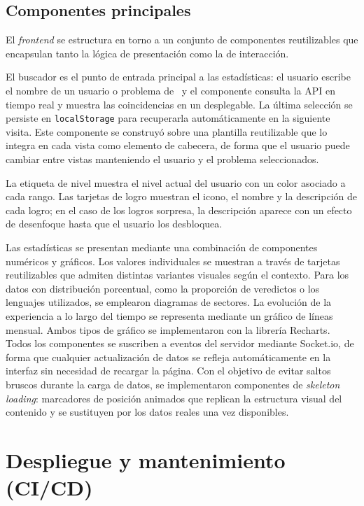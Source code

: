 \subsection{Componentes principales}

El \textit{frontend} se estructura en torno a un conjunto de componentes reutilizables que encapsulan tanto la lógica de presentación como la de interacción.

El buscador es el punto de entrada principal a las estadísticas: el usuario escribe el nombre de un usuario o problema de \aer\ y el componente consulta la API en tiempo real y muestra las coincidencias en un desplegable. La última selección se persiste en \texttt{localStorage} para recuperarla automáticamente en la siguiente visita. Este componente se construyó sobre una plantilla reutilizable que lo integra en cada vista como elemento de cabecera, de forma que el usuario puede cambiar entre vistas manteniendo el usuario y el problema seleccionados.

La etiqueta de nivel muestra el nivel actual del usuario con un color asociado a cada rango. Las tarjetas de logro muestran el icono, el nombre y la descripción de cada logro; en el caso de los logros sorpresa, la descripción aparece con un efecto de desenfoque hasta que el usuario los desbloquea.

Las estadísticas se presentan mediante una combinación de componentes numéricos y gráficos. Los valores individuales se muestran a través de tarjetas reutilizables que admiten distintas variantes visuales según el contexto. Para los datos con distribución porcentual, como la proporción de veredictos o los lenguajes utilizados, se emplearon diagramas de sectores. La evolución de la experiencia a lo largo del tiempo se representa mediante un gráfico de líneas mensual. Ambos tipos de gráfico se implementaron con la librería Recharts. Todos los componentes se suscriben a eventos del servidor mediante Socket.io, de forma que cualquier actualización de datos se refleja automáticamente en la interfaz sin necesidad de recargar la página. Con el objetivo de evitar saltos bruscos durante la carga de datos, se implementaron componentes de \textit{skeleton loading}: marcadores de posición animados que replican la estructura visual del contenido y se sustituyen por los datos reales una vez disponibles.

\section{Despliegue y mantenimiento (CI/CD)}

